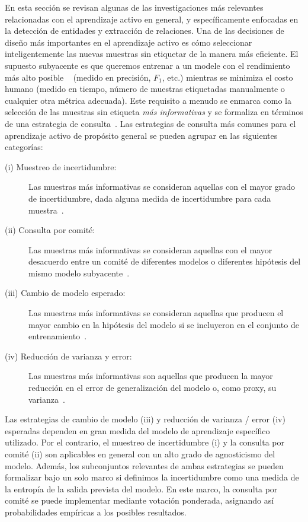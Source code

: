 En esta sección se revisan algunas de las investigaciones más relevantes relacionadas con el aprendizaje activo en general, y específicamente enfocadas en la detección de entidades y extracción de relaciones.
Una de las decisiones de diseño más importantes en el aprendizaje activo es cómo seleccionar inteligentemente las nuevas muestras sin etiquetar de la manera más eficiente. El supuesto subyacente es que queremos entrenar a un
modele con el rendimiento más alto posible ~ (medido en precisión, $ F_1 $, etc.) mientras se minimiza el costo humano (medido en tiempo, número de muestras etiquetadas manualmente o cualquier otra métrica adecuada).
Este requisito a menudo se enmarca como la selección de las muestras sin etiqueta \textit{más informativas} y se formaliza en términos de una estrategia de consulta~\cite{seungquery}.
Las estrategias de consulta más comunes para el aprendizaje activo de propósito general se pueden agrupar en las siguientes categorías:

\begin{description}
\item [(i) Muestreo de incertidumbre:] Las muestras más informativas se consideran aquellas con el mayor grado de incertidumbre, dada alguna medida de incertidumbre para cada muestra~\cite{Lewis1994148}.

\item [(ii) Consulta por comité:] Las muestras más informativas se consideran aquellas con el mayor desacuerdo entre un comité de diferentes modelos o diferentes hipótesis del mismo modelo subyacente~\cite{seungquery}.

\item [(iii) Cambio de modelo esperado:] Las muestras más informativas se consideran aquellas que producen el mayor cambio en la hipótesis del modelo si se incluyeron en el conjunto de entrenamiento~\cite{NIPS2007_3252}.

\item [(iv) Reducción de varianza y error:] Las muestras más informativas son aquellas que producen la mayor reducción en el error de generalización del modelo o, como proxy, su varianza~\cite{roy2001toward}.
\end{description}

Las estrategias de cambio de modelo (iii) y reducción de varianza / error (iv) esperadas dependen en gran medida del modelo de aprendizaje específico utilizado.
Por el contrario, el muestreo de incertidumbre (i) y la consulta por comité (ii) son aplicables en general con un alto grado de agnosticismo del modelo.
Además, los subconjuntos relevantes de ambas estrategias se pueden formalizar bajo un solo marco si definimos la incertidumbre como una medida de la entropía de la salida prevista del modelo.
En este marco, la consulta por comité se puede implementar mediante votación ponderada, asignando así probabilidades empíricas a los posibles resultados.

